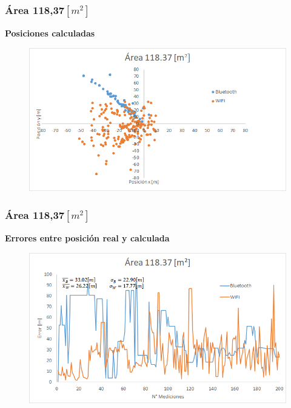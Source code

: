 \documentclass[mathserif]{beamer}
\begin{document}

\begin{frame}
\frametitle{Área 118,37$[m^2]$}

\textbf{Posiciones calculadas}

\begin{figure}
\includegraphics[width=\textwidth]{../figures_chesta/resultados/posicion__118_37}
\end{figure}


\end{frame}


\begin{frame}
\frametitle{Área 118,37$[m^2]$}

\textbf{Errores entre posición real y calculada}

\begin{figure}
\includegraphics[width=\textwidth]{../figures_chesta/resultados/area__118_37}
\end{figure}



\end{frame}
\end{document}
